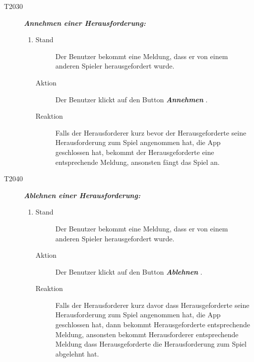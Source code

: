 \documentclass[parskip=full]{scrartcl}
\begin{document}
\begin{description}
		\item[T2030] \textbf{\textit{Annehmen einer Herausforderung: }} 
		\begin{enumerate}
			\item 
			\begin{description}
				\item[Stand] Der Benutzer bekommt eine Meldung, dass er von einem anderen Spieler herausgefordert wurde.
				\item[Aktion] Der Benutzer klickt auf den Button \textbf{\textit{Annehmen }}. 
				\item[Reaktion] Falls der Herausforderer kurz bevor der Herausgeforderte seine Herausforderung zum Spiel angenommen hat, die App geschlossen hat, bekommt der Herausgeforderte eine entsprechende Meldung, ansonsten fängt das Spiel an.
			\end{description}
		\end{enumerate}
		
		\item[T2040] \textbf{\textit{Ablehnen einer Herausforderung: }} 
		\begin{enumerate}
			\item 
			\begin{description}
				\item[Stand] Der Benutzer bekommt eine Meldung, dass er von einem anderen Spieler herausgefordert wurde.
				\item[Aktion] Der Benutzer klickt auf den Button \textbf{\textit{Ablehnen }}.
				\item[Reaktion] Falls der Herausforderer kurz davor dass Herausgeforderte seine Herausforderung zum Spiel angenommen hat, die App geschlossen hat, dann bekommt Herausgeforderte entsprechende Meldung, ansonsten bekommt Herausforderer entsprechende Meldung dass Herausgeforderte die Herausforderung zum Spiel abgelehnt hat.
			\end{description}
		\end{enumerate}
		

\end{description}
\end{document}
